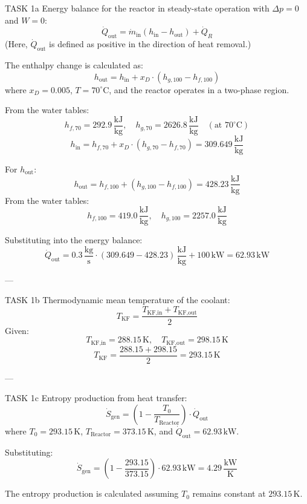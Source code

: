 TASK 1a  
Energy balance for the reactor in steady-state operation with \( \Delta p = 0 \) and \( W = 0 \):  
\[
\dot{Q}_{\text{out}} = \dot{m}_{\text{in}} \left( h_{\text{in}} - h_{\text{out}} \right) + \dot{Q}_R
\]  
(Here, \( \dot{Q}_{\text{out}} \) is defined as positive in the direction of heat removal.)  

The enthalpy change is calculated as:  
\[
h_{\text{out}} = h_{\text{in}} + x_D \cdot \left( h_{g,100} - h_{f,100} \right)
\]  
where \( x_D = 0.005 \), \( T = 70^\circ\text{C} \), and the reactor operates in a two-phase region.  

From the water tables:  
\[
h_{f,70} = 292.9 \, \frac{\text{kJ}}{\text{kg}}, \quad h_{g,70} = 2626.8 \, \frac{\text{kJ}}{\text{kg}} \quad (\text{at } 70^\circ\text{C})
\]  
\[
h_{\text{in}} = h_{f,70} + x_D \cdot \left( h_{g,70} - h_{f,70} \right) = 309.649 \, \frac{\text{kJ}}{\text{kg}}
\]  

For \( h_{\text{out}} \):  
\[
h_{\text{out}} = h_{f,100} + \left( h_{g,100} - h_{f,100} \right) = 428.23 \, \frac{\text{kJ}}{\text{kg}}
\]  
From the water tables:  
\[
h_{f,100} = 419.0 \, \frac{\text{kJ}}{\text{kg}}, \quad h_{g,100} = 2257.0 \, \frac{\text{kJ}}{\text{kg}}
\]  

Substituting into the energy balance:  
\[
\dot{Q}_{\text{out}} = 0.3 \, \frac{\text{kg}}{\text{s}} \cdot \left( 309.649 - 428.23 \right) \, \frac{\text{kJ}}{\text{kg}} + 100 \, \text{kW} = 62.93 \, \text{kW}
\]  

---

TASK 1b  
Thermodynamic mean temperature of the coolant:  
\[
T_{\text{KF}} = \frac{T_{\text{KF,in}} + T_{\text{KF,out}}}{2}
\]  
Given:  
\[
T_{\text{KF,in}} = 288.15 \, \text{K}, \quad T_{\text{KF,out}} = 298.15 \, \text{K}
\]  
\[
T_{\text{KF}} = \frac{288.15 + 298.15}{2} = 293.15 \, \text{K}
\]  

---

TASK 1c  
Entropy production from heat transfer:  
\[
\dot{S}_{\text{gen}} = \left( 1 - \frac{T_0}{T_{\text{Reactor}}} \right) \cdot \dot{Q}_{\text{out}}
\]  
where \( T_0 = 293.15 \, \text{K} \), \( T_{\text{Reactor}} = 373.15 \, \text{K} \), and \( \dot{Q}_{\text{out}} = 62.93 \, \text{kW} \).  

Substituting:  
\[
\dot{S}_{\text{gen}} = \left( 1 - \frac{293.15}{373.15} \right) \cdot 62.93 \, \text{kW} = 4.29 \, \frac{\text{kW}}{\text{K}}
\]  

The entropy production is calculated assuming \( T_0 \) remains constant at \( 293.15 \, \text{K} \).